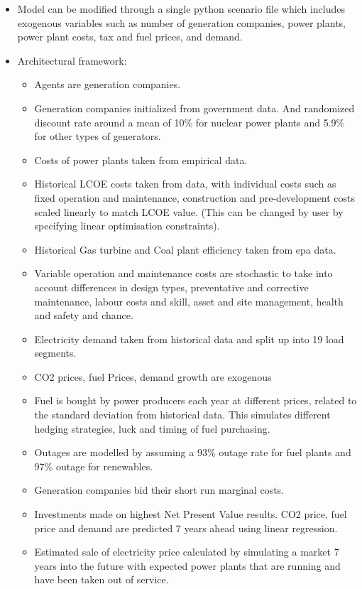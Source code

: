 \begin{itemize}
	\item Model can be modified through a single python scenario file which includes exogenous variables such as number of generation companies, power plants, power plant costs, tax and fuel prices, and demand.
	\item Architectural framework:
	\begin{itemize}
		\item Agents are generation companies.
		\item Generation companies initialized from government data. And randomized discount rate around a mean of 10\% for nuclear power plants and 5.9\% for other types of generators.
		\item Costs of power plants taken from empirical data. 
		\item Historical LCOE costs taken from data, with individual costs such as fixed operation and maintenance, construction and pre-development costs scaled linearly to match LCOE value. (This can be changed by user by specifying linear optimisation constraints).
		\item Historical Gas turbine and Coal plant efficiency taken from epa data.
		\item Variable operation and maintenance costs are stochastic to take into account differences in design types, preventative and corrective maintenance, labour costs and skill, asset and site management, health and safety and chance.
		\item Electricity demand taken from historical data and split up into 19 load segments.
		\item CO2 prices, fuel Prices, demand growth are exogenous
		\item Fuel is bought by power producers each year at different prices, related to the standard deviation from historical data. This simulates different hedging strategies, luck and timing of fuel purchasing.
		\item Outages are modelled by assuming a 93\% outage rate for fuel plants \cite{Ltd2016} and 97\% outage for renewables. \cite{carroll-j}
		\item Generation companies bid their short run marginal costs.
		\item Investments made on highest Net Present Value results. CO2 price, fuel price and demand are predicted 7 years ahead using linear regression. 
		\item Estimated sale of electricity price calculated by simulating a market 7 years into the future with expected power plants that are running and have been taken out of service.

\end{itemize}
\end{itemize}
